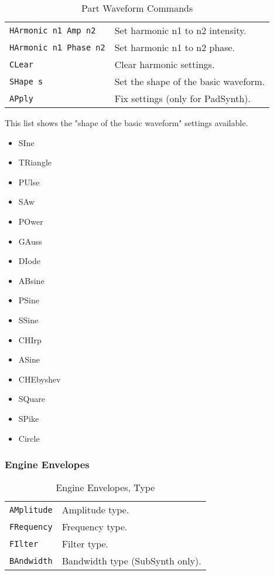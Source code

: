    \begin{table}[H]
      \centering
      \caption{Part Waveform Commands}
      \label{table:yoshimi_part_waveform_commands}
      \begin{tabular}{l l}

   \texttt{HArmonic n1 Amp n2} &
      Set harmonic n1 to n2 intensity. \\
   \texttt{HArmonic n1 Phase n2} &
      Set harmonic n1 to n2 phase. \\
   \texttt{CLear} &
      Clear harmonic settings. \\
   \texttt{SHape s} &
      Set the shape of the basic waveform. \\
   \texttt{APply} &
      Fix settings (only for PadSynth). \\

      \end{tabular}
   \end{table}

   This list shows the "shape of the basic waveform" settings available.

   \begin{itemize}
      \item SIne
      \item TRiangle
      \item PUlse
      \item SAw
      \item POwer
      \item GAuss
      \item DIode
      \item ABsine
      \item PSine
      \item SSine
      \item CHIrp
      \item ASine
      \item CHEbyshev
      \item SQuare
      \item SPike
      \item Circle
   \end{itemize}

\subsubsection{Engine Envelopes}
\label{subsec:command_line_engine_envelopes}

   \begin{table}[H]
      \centering
      \caption{Engine Envelopes, Type}
      \label{table:yoshimi_engine_envelopes_types}
      \begin{tabular}{l l}

\texttt{AMplitude} &
   Amplitude type. \\
\texttt{FRequency} &
   Frequency type. \\
\texttt{FIlter} &
   Filter type. \\
\texttt{BAndwidth} &
   Bandwidth type (SubSynth only). \\

      \end{tabular}
   \end{table}

